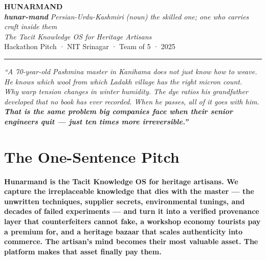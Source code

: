 \documentclass[11pt, a4paper]{article}
\begin{document}

\begin{center}
  {\fontsize{42}{46}\selectfont\bfseries\color{lapis} HUNARMAND}\\[2pt]
  {\small\color{saffron}\itshape\textbf{hunar-mand}\,\textbar\,Persian-Urdu-Kashmiri\,\textbar\,(noun) the skilled one; one who carries craft inside them}\\[12pt]
  {\Large\color{walnut}\itshape The Tacit Knowledge OS for Heritage Artisans}\\[10pt]
  {\small\color{muted} Hackathon Pitch · NIT Srinagar · Team of 5 · 2025}
\end{center}

\vspace{0.4em}
\noindent\color{rule}\rule{\linewidth}{1.5pt}
\vspace{0.6em}

\begin{heroquote}
\centering
\itshape\large\color{walnut}
``A 70-year-old Pashmina master in Kanihama does not just know how to weave. \\[3pt]
He knows which wool from which Ladakh village has the right micron count. \\[3pt]
Why warp tension changes in winter humidity. The dye ratios his grandfather \\[3pt]
developed that no book has ever recorded. When he passes, all of it goes with him. \\[6pt]
\bfseries\color{saffron} That is the same problem big companies face when their senior \\[3pt]
engineers quit --- just ten times more irreversible.''
\end{heroquote}

\section{The One-Sentence Pitch}

\begin{uspbox}
\textbf{Hunarmand is the Tacit Knowledge OS for heritage artisans. We capture the irreplaceable knowledge that dies with the master --- the unwritten techniques, supplier secrets, environmental tunings, and decades of failed experiments --- and turn it into a verified provenance layer that counterfeiters cannot fake, a workshop economy tourists pay a premium for, and a heritage bazaar that scales authenticity into commerce. The artisan's mind becomes their most valuable asset. The platform makes that asset finally pay them.}
\end{uspbox}
\end{document}
